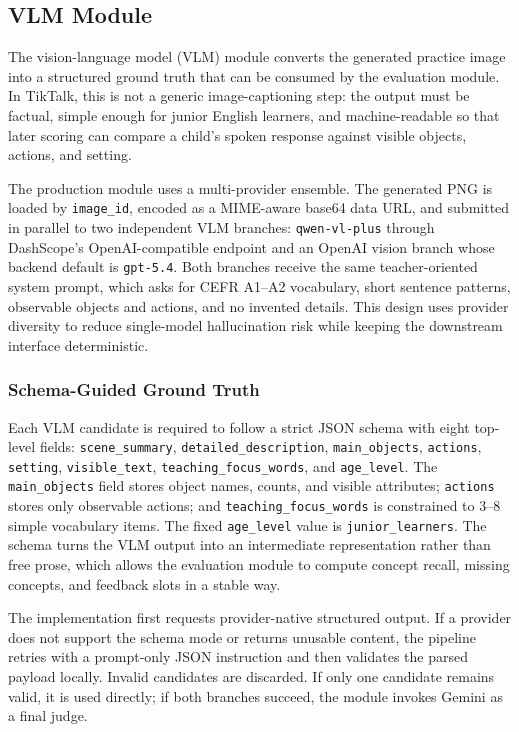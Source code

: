 \documentclass{article}
\begin{document}
\subsection{VLM Module}
\label{sec:vlm}

The vision-language model (VLM) module converts the generated practice
image into a structured ground truth that can be consumed by the
evaluation module. In TikTalk, this is not a generic image-captioning
step: the output must be factual, simple enough for junior English
learners, and machine-readable so that later scoring can compare a
child's spoken response against visible objects, actions, and setting.

The production module uses a multi-provider ensemble. The generated PNG
is loaded by \texttt{image\_id}, encoded as a MIME-aware base64 data URL,
and submitted in parallel to two independent VLM branches:
\texttt{qwen-vl-plus} through DashScope's OpenAI-compatible endpoint and
an OpenAI vision branch whose backend default is \texttt{gpt-5.4}. Both
branches receive the same teacher-oriented system prompt, which asks for
CEFR A1--A2 vocabulary, short sentence patterns, observable objects and
actions, and no invented details. This design uses provider diversity to
reduce single-model hallucination risk while keeping the downstream
interface deterministic.

\subsubsection{Schema-Guided Ground Truth}
\label{sec:vlm-schema}

Each VLM candidate is required to follow a strict JSON schema with eight
top-level fields: \texttt{scene\_summary},
\texttt{detailed\_description}, \texttt{main\_objects},
\texttt{actions}, \texttt{setting}, \texttt{visible\_text},
\texttt{teaching\_focus\_words}, and \texttt{age\_level}. The
\texttt{main\_objects} field stores object names, counts, and visible
attributes; \texttt{actions} stores only observable actions; and
\texttt{teaching\_focus\_words} is constrained to 3--8 simple vocabulary
items. The fixed \texttt{age\_level} value is
\texttt{junior\_learners}. The schema turns the VLM output into an
intermediate representation rather than free prose, which allows the
evaluation module to compute concept recall, missing concepts, and
feedback slots in a stable way.

The implementation first requests provider-native structured output.
If a provider does not support the schema mode or returns unusable
content, the pipeline retries with a prompt-only JSON instruction and
then validates the parsed payload locally. Invalid candidates are
discarded. If only one candidate remains valid, it is used directly; if
both branches succeed, the module invokes Gemini as a final judge.
\end{document}
